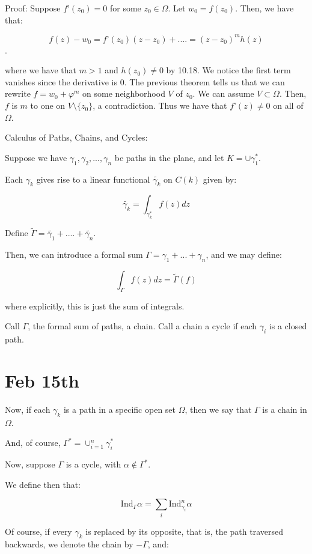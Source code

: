\documentclass[10pt]{article}
\newcommand{\ind}{\text{Ind}}
\begin{document}
Proof: Suppose $f’(z_0) = 0$ for some $z_0 \in \Omega$. Let $w_0 = f(z_0)$. Then, we have that:

$$ f(z) - w_0 = f’(z_0) (z - z_0) + .... = (z - z_0)^m h(z) $$.

where we have that $m > 1$ and $h(z_0) \not = 0$ by 10.18. We notice the first term vanishes since the derivative is 0. The previous theorem tells us that we can rewrite $f = w_0 + \varphi^m$ on some neighborhood $V$ of $z_0$. We can assume $V \subset \Omega$. Then, $f$ is $m$ to one on $V \setminus \{ z_0 \}$, a contradiction. Thus we have that $f’(z) \not = 0$ on all of $\Omega$. 

Calculus of Paths, Chains, and Cycles:

Suppose we have $\gamma_1,\gamma_2,...,\gamma_n$ be paths in the plane, and let $K = \cup \gamma_1^*$. 

Each $\gamma_k$ gives rise to a linear functional $\tilde{\gamma_k}$ on $C(k)$ given by:

$$\tilde{\gamma_k} = \int_{\gamma_k^*} f(z) dz$$

Define $\tilde{\Gamma} = \tilde{\gamma_1} + .... + \tilde{\gamma_n}$.

Then, we can introduce a formal sum $\Gamma = \gamma_1 + ... + \gamma_n$, and we may define:

$$\int_{\Gamma} f(z) dz = \tilde{\Gamma}(f)$$

where explicitly, this is just the sum of integrals.

Call $\Gamma$, the formal sum of paths, a chain. Call a chain a cycle if each $\gamma_i$ is a closed path.

\section*{Feb 15th}

Now, if each $\gamma_k$ is a path in a specific open set $\Omega$, then we say that $\Gamma$ is a chain in $\Omega$.

And, of course, $\Gamma^* = \cup_{i=1}^n \gamma_i^*$

Now, suppose $\Gamma$ is a cycle, with $\alpha \not \in \Gamma^*$.

We define then that:

$$\ind_\Gamma \alpha = \sum_i \ind_{\gamma_i}^n \alpha$$

Of course, if every $\gamma_k$ is replaced by its opposite, that is, the path traversed backwards, we denote the chain by $-\Gamma$, and:
\end{document}
